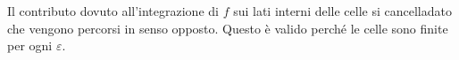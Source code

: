 \documentclass[preview]{standalone}
\begin{document}
\begin{center}
Il contributo dovuto all'integrazione di $f$ sui lati interni delle celle si cancelladato che vengono percorsi in senso opposto. Questo è valido perché le celle sono finite per ogni $\varepsilon$.
\end{center}
\end{document}
